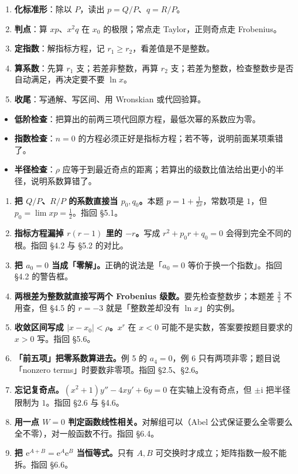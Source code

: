 \documentclass[11pt]{ctexart}
\newcommand{\ii}{\mathrm{i}}
\newcommand{\ee}{\mathrm{e}}
\begin{document}

\begin{enumerate}
  \item \textbf{化标准形}：除以 $P$，读出 $p=Q/P$、$q=R/P$。
  \item \textbf{判点}：算 $xp$、$x^2q$ 在 $x_0$ 的极限；常点走 Taylor，正则奇点走 Frobenius。
  \item \textbf{定指数}：解指标方程，记 $r_1\geq r_2$，看差值是不是整数。
  \item \textbf{算系数}：先算 $r_1$ 支；若差非整数，再算 $r_2$ 支；若差为整数，检查整数步是否自动满足，再决定要不要 $\ln x$。
  \item \textbf{收尾}：写通解、写区间、用 Wronskian 或代回验算。
\end{enumerate}


\begin{itemize}
  \item \textbf{低阶检查}：把算出的前两三项代回原方程，最低次幂的系数应为零。
  \item \textbf{指数检查}：$n=0$ 的方程必须正好是指标方程；若不等，说明前面某项乘错了。
  \item \textbf{半径检查}：$\rho$ 应等于到最近奇点的距离；若算出的级数比值法给出更小的半径，说明系数算错了。
\end{itemize}


\begin{enumerate}[leftmargin=2.2em]
  \item \textbf{把 $Q/P$、$R/P$ 的系数直接当 $p_0,q_0$。}本题 $p=1+\frac{1}{2x}$，常数项是 $1$，但 $p_0=\lim xp=\frac12$。指回 §5.1。
  \item \textbf{指标方程漏掉 $r(r-1)$ 里的 $-r$。}写成 $r^2+p_0r+q_0=0$ 会得到完全不同的根。指回 §4.2 与 §5.2 的对比。
  \item \textbf{把 $a_0=0$ 当成「零解」。}正确的说法是「$a_0=0$ 等价于换一个指数」。指回 §4.2 的警告框。
  \item \textbf{两根差为整数就直接写两个 Frobenius 级数。}要先检查整数步；本题差 $\frac32$ 不用查，但 §4.5 的 $r=-3$ 就是「整数差却没有 $\ln x$」的实例。
  \item \textbf{收敛区间写成 $|x-x_0|<\rho$。}$x^r$ 在 $x<0$ 可能不是实数，答案要按题目要求的 $x>0$ 写。指回 §5.6。
  \item \textbf{「前五项」把零系数算进去。}例 5 的 $a_4=0$，例 6 只有两项非零；题目说「nonzero terms」时要数非零项。指回 §2.5、§2.6。
  \item \textbf{忘记复奇点。}$(x^2+1)y''-4xy'+6y=0$ 在实轴上没有奇点，但 $\pm\ii$ 把半径限制为 $1$。指回 §2.6 与 §4.6。
  \item \textbf{用一点 $W=0$ 判定函数线性相关。}对解组可以（Abel 公式保证要么全零要么全不零），对一般函数不行。指回 §6.4。
  \item \textbf{把 $\ee^{A+B}=\ee^A\ee^B$ 当恒等式。}只有 $A,B$ 可交换时才成立；矩阵指数一般不能拆。指回 §6.6。
\end{enumerate}
\end{document}
